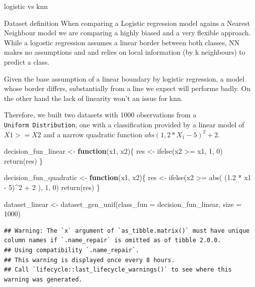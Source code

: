 \documentclass[
  ignorenonframetext,
]{article}
\newenvironment{Shaded}{\begin{snugshade}}{\end{snugshade}}
\newcommand{\AttributeTok}[1]{\textcolor[rgb]{0.77,0.63,0.00}{#1}}
\newcommand{\ControlFlowTok}[1]{\textcolor[rgb]{0.13,0.29,0.53}{\textbf{#1}}}
\newcommand{\DecValTok}[1]{\textcolor[rgb]{0.00,0.00,0.81}{#1}}
\newcommand{\FloatTok}[1]{\textcolor[rgb]{0.00,0.00,0.81}{#1}}
\newcommand{\FunctionTok}[1]{\textcolor[rgb]{0.00,0.00,0.00}{#1}}
\newcommand{\NormalTok}[1]{#1}
\newcommand{\OtherTok}[1]{\textcolor[rgb]{0.56,0.35,0.01}{#1}}
\newcommand{\SpecialCharTok}[1]{\textcolor[rgb]{0.00,0.00,0.00}{#1}}
\begin{document}
\begin{frame}[fragile]{logistic vs knn}
\protect\hypertarget{logistic-vs-knn}{}
\begin{block}{Dataset definition}
\protect\hypertarget{dataset-definition}{}
When comparing a Logistic regression model agains a Nearest Neighbour model we are comparing a highly biased and a very flexible approach. While a logostic regression assumes a linear border between both classes, NN makes no assumptions and and relies on local information (by k neighbours) to predict a class.

Given the base assumption of a linear boundary by logistic regression, a model whose border differs, substantially from a line we expect will performe badly. On the other hand the lack of linearity won't an issue for knn.

Therefore, we built two datasets with 1000 observations from a \texttt{Uniform\ Distribution}, one with a classification provided by a linear model of \(X1 >= X2\) and a narrow quadratic function \(abs(1,2 * X_{1} - 5)^2 + 2\).

\begin{Shaded}
\begin{Highlighting}[]
\NormalTok{decision\_fun\_linear }\OtherTok{\textless{}{-}} \ControlFlowTok{function}\NormalTok{(x1, x2)\{}
\NormalTok{  res }\OtherTok{\textless{}{-}} \FunctionTok{ifelse}\NormalTok{(x2 }\SpecialCharTok{\textgreater{}=}\NormalTok{ x1, }\DecValTok{1}\NormalTok{, }\DecValTok{0}\NormalTok{)}
  \FunctionTok{return}\NormalTok{(res)}
\NormalTok{\}}

\NormalTok{decision\_fun\_quadratic }\OtherTok{\textless{}{-}} \ControlFlowTok{function}\NormalTok{(x1, x2)\{}
\NormalTok{  res }\OtherTok{\textless{}{-}} \FunctionTok{ifelse}\NormalTok{(x2 }\SpecialCharTok{\textgreater{}=} \FunctionTok{abs}\NormalTok{( (}\FloatTok{1.2} \SpecialCharTok{*}\NormalTok{ x1 }\SpecialCharTok{{-}} \DecValTok{5}\NormalTok{)}\SpecialCharTok{\^{}}\DecValTok{2} \SpecialCharTok{+} \DecValTok{2}\NormalTok{ ), }\DecValTok{1}\NormalTok{, }\DecValTok{0}\NormalTok{)}
  \FunctionTok{return}\NormalTok{(res)}
\NormalTok{\}}

\NormalTok{dataset\_linear }\OtherTok{\textless{}{-}} \FunctionTok{dataset\_gen\_unif}\NormalTok{(}\AttributeTok{class\_fun =}\NormalTok{ decision\_fun\_linear, }\AttributeTok{size =} \DecValTok{1000}\NormalTok{)}
\end{Highlighting}
\end{Shaded}

\begin{verbatim}
## Warning: The `x` argument of `as_tibble.matrix()` must have unique column names if `.name_repair` is omitted as of tibble 2.0.0.
## Using compatibility `.name_repair`.
## This warning is displayed once every 8 hours.
## Call `lifecycle::last_lifecycle_warnings()` to see where this warning was generated.
\end{verbatim}


\end{block}
\end{frame}
\end{document}
